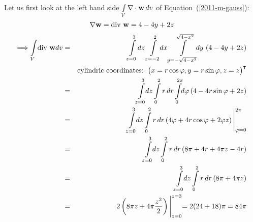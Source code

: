 {\begin{enumerate}
Let us first look at the left hand side $\int \limits_V \nabla \cdot {\bf w} \, dv $
of Equation~(\ref{2011-m-gauss}):
$$
  \nabla {\bf w}=\textrm{div } {\bf w}=4-4y+2z
$$
\begin{eqnarray*}
  \Longrightarrow \int \limits_V \! \textrm{div } {\bf w} dv& = &
  \int \limits_{z=0}^3 \! dz \int \limits_{x=-2}^2 \!\! dx
  \int \limits_{y=-\sqrt{4-x^2}}^{\sqrt{4-x^2}} \!\!\!dy\,
    \left(4-4y+2z\right) \\
  & & \mbox{cylindric coordinates: }
    \begin{pmatrix}
      x   =   r \cos \varphi ,
      y   =   r \sin \varphi ,
      z   =   z
    \end{pmatrix}^\intercal
   \\
  & = & \int \limits_{z=0}^3 \!\! dz \int \limits_0^2 r\, dr
  \int \limits_0^{2\pi} \!\! d\varphi \left(4-4r \sin \varphi+2z\right)  \\
  & = & \int \limits_{z=0}^3 \!\! dz \int \limits_0^2 r \, dr
  \left(4 \varphi +4r\cos\varphi+2\varphi z\right)
  \Biggl|_{\varphi=0}^{2 \pi}  \\
  & = & \int \limits_{z=0}^3 \!\! dz \int \limits_0^2 r\, dr
  \left(8 \pi +4r+4 \pi z -4r\right)  \\
  & = & \int \limits_{z=0}^3 \!\! dz \int \limits_0^2 r\, dr
  \left(8 \pi +4 \pi z\right) \\
  & = & 2 \left( 8 \pi z +4 \pi \frac{z^2}{2}\right)\Biggl|_{z=0}^{z=3}=
    2 (24+18) \pi = 84 \pi
\end{eqnarray*}


\end{enumerate}}
